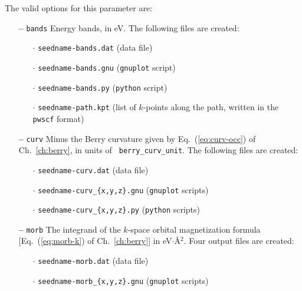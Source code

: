 The valid options for this parameter are:
\begin{itemize}

\item[{\bf --}] \verb#bands# Energy bands, in eV. The following files
  are created:
\begin{itemize}
  
   \item[$\cdot$] {\tt seedname-bands.dat} (data file) 

   \item[$\cdot$] {\tt seedname-bands.gnu} ({\tt gnuplot} script)

   \item[$\cdot$] {\tt seedname-bands.py} ({\tt python} script)

   \item[$\cdot$] {\tt seedname-path.kpt} (list of $k$-points along
     the path, written in the {\tt pwscf} format)

\end{itemize}

\item[{\bf --}] \verb#curv# Minus the Berry curvature given by
  Eq.~(\ref{eq:curv-occ}) of Ch.~\ref{ch:berry}, in units of {\tt
    berry\_curv\_unit}. The following files are created:

\begin{itemize}

   \item[$\cdot$] {\tt seedname-curv.dat} (data file) 

   \item[$\cdot$] {\tt seedname-curv\_\{x,y,z\}.gnu} ({\tt gnuplot} scripts)

   \item[$\cdot$] {\tt seedname-curv\_\{x,y,z\}.py} ({\tt python} scripts)

\end{itemize}

\item[{\bf --}] \verb#morb# The integrand of the $k$-space orbital
  magnetization formula [Eq.~(\ref{eq:morb-k}) of Ch.~\ref{ch:berry}]
  in eV$\cdot$\AA$^2$. Four output files are created:

\begin{itemize}

   \item[$\cdot$] {\tt seedname-morb.dat} (data file)

   \item[$\cdot$] {\tt seedname-morb\_\{x,y,z\}.gnu} ({\tt gnuplot}
     scripts)


\end{itemize}
\end{itemize}
